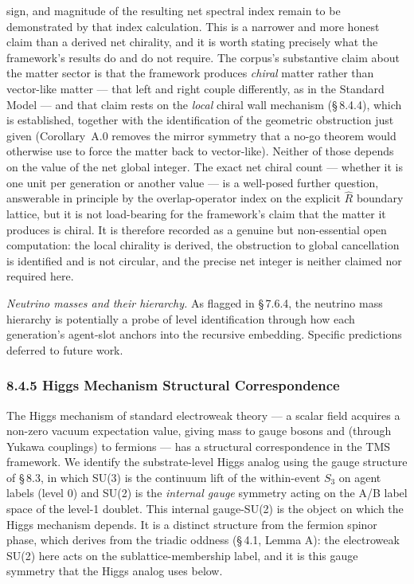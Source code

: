\documentclass[11pt,oneside]{report}
\theoremstyle{definition}
\theoremstyle{remark}
\begin{document}
sign, and magnitude of the resulting net spectral index remain to be demonstrated by
that index calculation. This is a narrower and more honest claim than a derived net
chirality, and it is worth stating precisely what the framework's results do and do
not require. The corpus's substantive claim about the matter sector is that the
framework produces \emph{chiral} matter rather than vector-like matter --- that left
and right couple differently, as in the Standard Model --- and that claim rests on
the \emph{local} chiral wall mechanism (\S\,8.4.4), which is established, together
with the identification of the geometric obstruction just given (Corollary~A.0
removes the mirror symmetry that a no-go theorem would otherwise use to force the
matter back to vector-like). Neither of those depends on the value of the net global
integer. The exact net chiral count --- whether it is one unit per generation or
another value --- is a well-posed further question, answerable in principle by the
overlap-operator index on the explicit \ensuremath{\hat{R}} boundary lattice, but it is not
load-bearing for the framework's claim that the matter it produces is chiral. It is
therefore recorded as a genuine but non-essential open computation: the local
chirality is derived, the obstruction to global cancellation is identified and is
not circular, and the precise net integer is neither claimed nor required here.

\emph{Neutrino masses and their hierarchy.} As flagged in \S\,7.6.4, the
neutrino mass hierarchy is potentially a probe of level identification
through how each generation's agent-slot anchors into the recursive
embedding. Specific predictions deferred to future work.

\subsubsection*{8.4.5 Higgs Mechanism Structural Correspondence}

The Higgs mechanism of standard electroweak theory --- a scalar field
acquires a non-zero vacuum expectation value, giving mass to gauge
bosons and (through Yukawa couplings) to fermions --- has a structural
correspondence in the TMS framework. We identify the substrate-level
Higgs analog using the gauge structure of \S\,8.3, in which SU(3) is the
continuum lift of the within-event \ensuremath{S_{3}} on agent labels (level 0) and
SU(2) is the \emph{internal gauge} symmetry acting on the A/B label space
of the level-1 doublet. This internal gauge-SU(2) is the object on which
the Higgs mechanism depends. It is a distinct structure from the fermion
spinor phase, which derives from the triadic oddness (\S\,4.1, Lemma A):
the electroweak SU(2) here acts on the sublattice-membership label, and it
is this gauge symmetry that the Higgs analog uses below.
\end{document}
